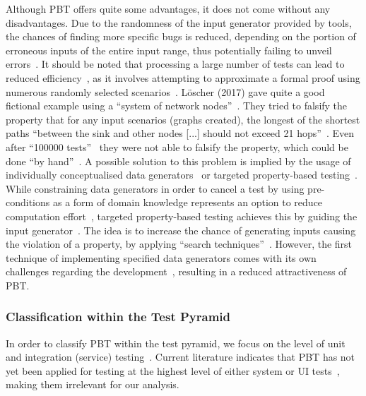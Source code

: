 \documentclass[runningheads]{llncs}
\begin{document}
Although PBT offers quite some advantages, it does not come without any disadvantages. Due to the randomness of the input generator provided by tools, the chances of finding more specific bugs is reduced, depending on the portion of erroneous inputs of the entire input range, thus potentially failing to unveil errors~\cite{Loescher2017,Padhye2019,ElazarMittelman2023,Shi2023}. It should be noted that processing a large number of tests can lead to reduced efficiency~\cite{ElazarMittelman2023,Shi2023}, as it involves attempting to approximate a formal proof using numerous randomly selected scenarios~\cite{Fink1997,ElazarMittelman2023,Paraskevopoulou2015}. Löscher (2017) gave quite a good fictional example using a ``system of network nodes''~\cite{Loescher2017}. They tried to falsify the property that for any input scenarios (graphs created), the longest of the shortest paths ``between the sink and other nodes [...] should not exceed 21 hops''~\cite{Loescher2017}. Even after ``100000 tests''~\cite{Loescher2017} they were not able to falsify the property, which could be done ``by hand''~\cite{Loescher2017}. A possible solution to this problem is implied by the usage of individually conceptualised data generators~\cite{Loescher2017,ElazarMittelman2023,Shi2023,Paraskevopoulou2015,Claessen2000} or targeted property-based testing~\cite{Loescher2017}. While constraining data generators in order to cancel a test by using pre-conditions as a form of domain knowledge represents an option to reduce computation effort~\cite{Loescher2017,ElazarMittelman2023,Shi2023}, targeted property-based testing achieves this by guiding the input generator~\cite{Loescher2017}. The idea is to increase the chance of generating inputs causing the violation of a property, by applying ``search techniques''~\cite{Loescher2017}. However, the first technique of implementing specified data generators comes with its own challenges regarding the development~\cite{Loescher2017,ElazarMittelman2023,Shi2023}, resulting in a reduced attractiveness of PBT.

\subsubsection{Classification within the Test Pyramid}
In order to classify PBT within the test pyramid, we focus on the level of unit and integration (service) testing~\cite{Aniche2022,Radziwill2020}. Current literature indicates that PBT has not yet been applied for testing at the highest level of either system or UI tests~\cite{Radziwill2020,Aniche2022}, making them irrelevant for our analysis.
\end{document}
